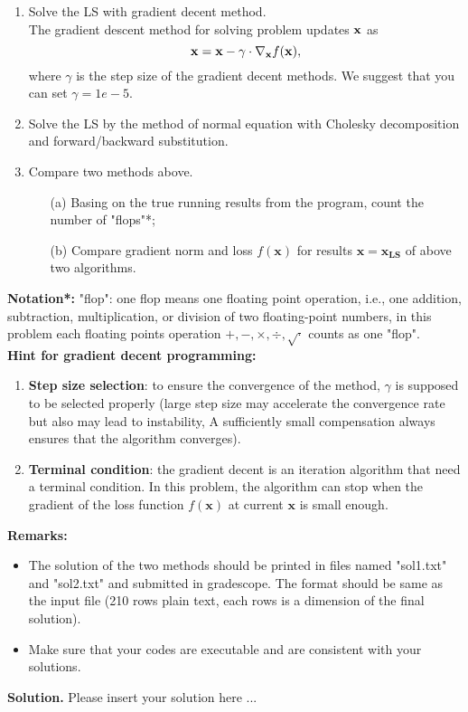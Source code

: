 \documentclass[english,onecolumn]{IEEEtran}
\begin{document}
\begin{enumerate}
    \item Solve the LS with gradient decent method.\\
    The gradient descent method for solving problem updates $ {\bf x}$ as
    $$
        {\bf x} = {\bf x} - \gamma \cdot \nabla_{{\bf x}} f(\mathbf{x}),
    $$
    where $\gamma$ is the step size of the gradient decent methods. We suggest that you can set $\gamma=1e-5$.
    \item Solve the LS by the method of normal equation with Cholesky decomposition and forward/backward substitution.
    \item Compare two methods above. 
    \begin{enumerate}
        \item[(a)] Basing on the true running results from the program, count the number of "flops"*;
        \item[(b)] Compare gradient norm and loss $f(\mathbf{x})$ for results $\mathbf{x}=\mathbf{x_{LS}}$ of above two algorithms.
    \end{enumerate}
\end{enumerate}
    \textbf{Notation*:} "flop": one flop means one floating point operation, i.e., one addition, subtraction, multiplication, or division of two floating-point numbers, in this problem each floating points operation $+,-,\times, \div, \sqrt{\cdot}$ counts as one "flop". \\
    \textbf{Hint for gradient decent programming:} 
    \begin{enumerate}
        \item \textbf{Step size selection}: to ensure the convergence of the method, $\gamma$ is supposed to be selected properly (large step size may accelerate the convergence rate but also may lead to instability, A sufficiently small compensation always ensures that the algorithm converges). 
        \item \textbf{Terminal condition}: the gradient decent is an iteration algorithm that need a terminal condition. In this problem, the algorithm can stop when the gradient of the loss function $f(\mathbf{x})$ at current $\mathbf{x}$ is small enough.
    \end{enumerate}
    \noindent\textbf{Remarks: }
   \begin{itemize}
    \item The solution of the two methods should be printed in files named "sol1.txt" and "sol2.txt" and submitted in gradescope.  The format should be same as the input file (210 rows plain text, each rows is a dimension of the final solution).
    \item Make sure that your codes are executable and are consistent with your solutions.
   \end{itemize}
\noindent
\textbf{Solution.}
Please insert your solution here ...
\end{document}
